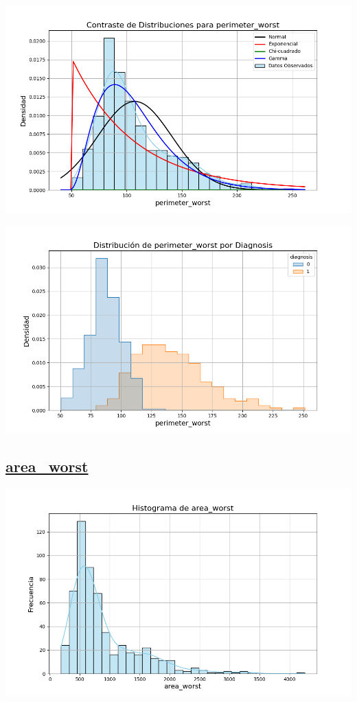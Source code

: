 \documentclass[a4paper, 12pt]{article}
\begin{document}
\includegraphics[width=\textwidth]{../Plots/plots_stats/perimeter_worst/distribuciones_conocidas_perimeter_worst.png}

\includegraphics[width=\textwidth]{../Plots/plots_diagnosis/distribucion_perimeter_worst_por_diagnosis.png}

\subsection*{\underline{area\_worst}}

	\includegraphics[width=\textwidth]{../Plots/plots_stats/area_worst/histograma_area_worst.png}
\end{document}
